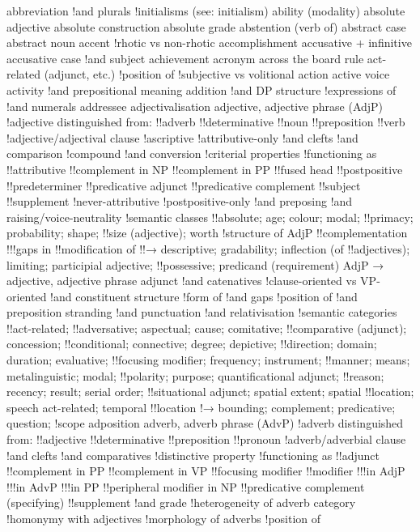 abbreviation
!and plurals
!initialisms (see: initialism)
ability (modality)
absolute adjective
absolute construction
absolute grade
abstention (verb of)
abstract case
abstract noun
accent
!rhotic vs non-rhotic
accomplishment
accusative + infinitive
accusative case
!and subject
achievement
acronym
across the board rule
act-related (adjunct, etc.)
!position of
!subjective vs volitional
action
active voice
activity
!and prepositional meaning
addition
!and DP structure
!expressions of
!and numerals
addressee
adjectivalisation
adjective, adjective phrase (AdjP)
!adjective distinguished from:
!!adverb
!!determinative
!!noun
!!preposition
!!verb
!adjective/adjectival clause
!ascriptive
!attributive-only
!and clefts
!and comparison
!compound
!and conversion
!criterial properties
!functioning as
!!attributive
!!complement in NP
!!complement in PP
!!fused head
!!postpositive
!!predeterminer
!!predicative adjunct
!!predicative complement
!!subject
!!supplement
!never-attributive
!postpositive-only
!and preposing
!and raising/voice-neutrality
!semantic classes
!!absolute; age; colour; modal;
!!primacy; probability; shape;
!!size (adjective); worth
!structure of AdjP
!!complementation
!!!gaps in
!!modification of
!!→ descriptive; gradability; inflection (of
!!adjectives); limiting; participial adjective;
!!possessive; predicand (requirement)
AdjP → adjective, adjective phrase
adjunct
!and catenatives
!clause-oriented vs VP-oriented
!and constituent structure
!form of
!and gaps
!position of
!and preposition stranding
!and punctuation
!and relativisation
!semantic categories
!!act-related;
!!adversative; aspectual; cause; comitative;
!!comparative (adjunct); concession;
!!conditional; connective; degree; depictive;
!!direction; domain; duration; evaluative;
!!focusing modifier; frequency; instrument;
!!manner; means; metalinguistic; modal;
!!polarity; purpose; quantificational adjunct;
!!reason; recency; result; serial order;
!!situational adjunct; spatial extent; spatial
!!location; speech act-related; temporal
!!location
!→ bounding; complement; predicative; question;
!scope
adposition
adverb, adverb phrase (AdvP)
!adverb distinguished from:
!!adjective
!!determinative
!!preposition
!!pronoun
!adverb/adverbial clause
!and clefts
!and comparatives
!distinctive property
!functioning as
!!adjunct
!!complement in PP
!!complement in VP
!!focusing modifier
!!modifier
!!!in AdjP
!!!in AdvP
!!!in PP
!!peripheral modifier in NP
!!predicative complement (specifying)
!!supplement
!and grade
!heterogeneity of adverb category
!homonymy with adjectives
!morphology of adverbs
!position of
